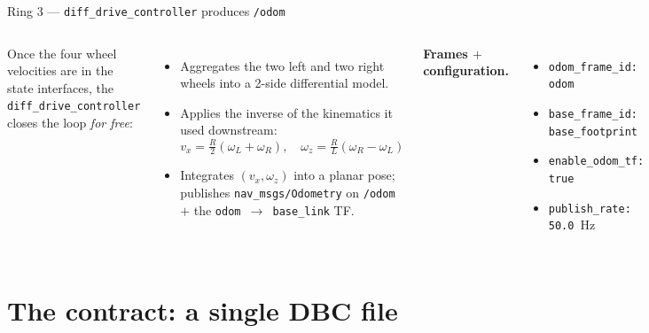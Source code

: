 \begin{frame}{Ring 3 — \texttt{diff\_drive\_controller} produces \texttt{/odom}}
  \begin{columns}[T,onlytextwidth]
      Once the four wheel velocities are in the state interfaces, the
      \texttt{diff\_drive\_controller} closes the loop \emph{for free}:

      \begin{itemize}\setlength\itemsep{2pt}
        \item Aggregates the two left and two right wheels into a 2-side
              differential model.
        \item Applies the inverse of the kinematics it used downstream:
              \[
                v_x = \tfrac{R}{2}(\omega_L+\omega_R),\quad
                \omega_z = \tfrac{R}{L}(\omega_R-\omega_L)
              \]
        \item Integrates \((v_x,\omega_z)\) into a planar pose; publishes
              \texttt{nav\_msgs/Odometry} on \texttt{/odom} \(+\) the
              \texttt{odom $\to$ base\_link} TF.
      \end{itemize}

      \textbf{Frames \(+\) configuration.}
      \begin{itemize}\setlength\itemsep{1pt}
        \item \texttt{odom\_frame\_id: odom}
        \item \texttt{base\_frame\_id: base\_footprint}
        \item \texttt{enable\_odom\_tf: true}
        \item \texttt{publish\_rate: 50.0}~Hz
      \end{itemize}
  \end{columns}
\end{frame}

\section{The contract: a single DBC file}

